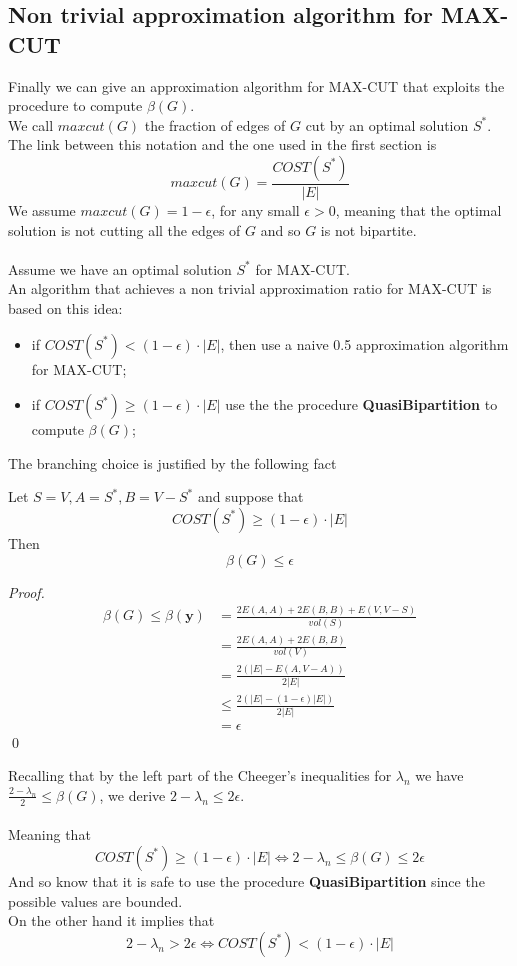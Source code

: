 \subsection{Non trivial approximation algorithm for MAX-CUT}
Finally we can give an approximation algorithm for MAX-CUT that exploits the procedure to compute $ \beta(G) $.\\
We call $ maxcut(G) $ the fraction of edges of $ G $ cut by an optimal solution $ S^* $. The link between this notation and the one used in the first section is
\[ maxcut(G) = \frac{COST(S^*)}{|E|}\]
We assume $ maxcut(G) = 1-\epsilon $, for any small $ \epsilon > 0 $, meaning that the optimal solution is not cutting all the edges of $ G $ and so $ G $ is not bipartite. 
\\
\\
Assume we have an optimal solution  $ S^* $ for MAX-CUT. \\
An algorithm that achieves a non trivial approximation ratio for MAX-CUT is based on this idea:
\begin{itemize}
	\item if $ COST(S^*) < (1-\epsilon) \cdot |E|$, then use a naive 0.5 approximation algorithm for MAX-CUT;
	\item if $ COST(S^*) \geq (1-\epsilon) \cdot |E| $ use the the procedure \textbf{QuasiBipartition} to compute $ \beta(G) $;
\end{itemize}
The branching choice is justified by the following fact
\begin{claim}
Let $S=V, A=S^*, B=V-S^*$ and suppose that
\[ COST(S^*) \geq (1-\epsilon) \cdot |E|\]
Then
\[ \beta(G) \leq \epsilon\]
\begin{proof}
\begin{align*}
\beta(G) \leq \beta(\mathbf{y})  &= \frac{2E(A,A)+2E(B,B)+E(V,V-S)}{vol(S)} \\
&= \frac{2E(A,A)+2E(B,B)}{vol(V)} \\
&= \frac{2(|E|- E(A, V-A))}{2|E|} \\
&\leq \frac{2(|E|- (1- \epsilon)|E|)}{2|E|}\\
&= \epsilon
\end{align*}
\qed
\end{proof}
\end{claim}


Recalling that by the left part of the Cheeger's inequalities for $ \lambda_n $ we have $\frac{2-\lambda_n}{2} \leq \beta(G) $, we derive $ 2-\lambda_n \leq 2 \epsilon $.\\ \\
Meaning that
\[ COST(S^*) \geq (1-\epsilon) \cdot |E| \iff 2-\lambda_n \leq \beta(G) \leq 2 \epsilon\]
And so know that it is safe to use the procedure \textbf{QuasiBipartition} since the possible values are bounded. \\
On the other hand it implies that 
\[ 2-\lambda_n > 2\epsilon \iff COST(S^*) < (1-\epsilon) \cdot |E| \]

